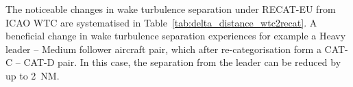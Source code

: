 The noticeable changes in wake turbulence separation under RECAT-EU from ICAO WTC are systematised in Table~\ref{tab:delta_distance_wtc2recat}. A beneficial change in wake turbulence separation experiences for example a Heavy leader -- Medium follower aircraft pair, which after re-categorisation form a CAT-C -- CAT-D pair. In this case, the separation from the leader can be reduced by up to 2~NM. 

\begin{table}[h]
\centering
{}
\end{table}
